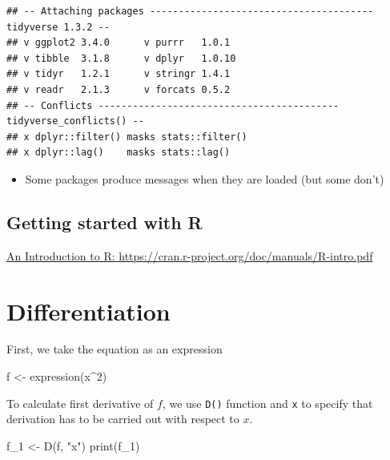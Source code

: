 \documentclass[
]{book}
\newenvironment{Shaded}{\begin{snugshade}}{\end{snugshade}}
\newcommand{\DecValTok}[1]{\textcolor[rgb]{0.00,0.00,0.81}{#1}}
\newcommand{\FunctionTok}[1]{\textcolor[rgb]{0.00,0.00,0.00}{#1}}
\newcommand{\NormalTok}[1]{#1}
\newcommand{\OtherTok}[1]{\textcolor[rgb]{0.56,0.35,0.01}{#1}}
\newcommand{\SpecialCharTok}[1]{\textcolor[rgb]{0.00,0.00,0.00}{#1}}
\newcommand{\StringTok}[1]{\textcolor[rgb]{0.31,0.60,0.02}{#1}}
\providecommand{\tightlist}{%
  \setlength{\itemsep}{0pt}\setlength{\parskip}{0pt}}
\begin{document}
\begin{verbatim}
## -- Attaching packages --------------------------------------- tidyverse 1.3.2 --
## v ggplot2 3.4.0      v purrr   1.0.1 
## v tibble  3.1.8      v dplyr   1.0.10
## v tidyr   1.2.1      v stringr 1.4.1 
## v readr   2.1.3      v forcats 0.5.2 
## -- Conflicts ------------------------------------------ tidyverse_conflicts() --
## x dplyr::filter() masks stats::filter()
## x dplyr::lag()    masks stats::lag()
\end{verbatim}

\begin{itemize}
\tightlist
\item
  Some packages produce messages when they are loaded (but some don't)
\end{itemize}

\hypertarget{getting-started-with-r}{%
\section{Getting started with R}\label{getting-started-with-r}}

\href{https://cran.r-project.org/doc/manuals/R-intro.pdf}{An Introduction to R: https://cran.r-project.org/doc/manuals/R-intro.pdf}

\hypertarget{differentiation}{%
\chapter{Differentiation}\label{differentiation}}

First, we take the equation as an expression

\begin{Shaded}
\begin{Highlighting}[]
\NormalTok{f }\OtherTok{\textless{}{-}} \FunctionTok{expression}\NormalTok{(x}\SpecialCharTok{\^{}}\DecValTok{2}\NormalTok{)}
\end{Highlighting}
\end{Shaded}

To calculate first derivative of \(f\), we use \texttt{D()} function and \texttt{x} to specify that derivation has to be carried out with respect to
\(x\).

\begin{Shaded}
\begin{Highlighting}[]
\NormalTok{f\_1 }\OtherTok{\textless{}{-}} \FunctionTok{D}\NormalTok{(f, }\StringTok{"x"}\NormalTok{)}
\FunctionTok{print}\NormalTok{(f\_1)}
\end{Highlighting}
\end{Shaded}
\end{document}
